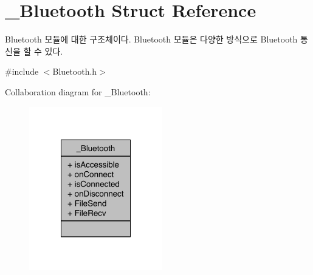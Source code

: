\hypertarget{struct__Bluetooth}{\section{\-\_\-\-Bluetooth Struct Reference}
\label{struct__Bluetooth}
}


Bluetooth 모듈에 대한 구조체이다. Bluetooth 모듈은 다양한 방식으로 Bluetooth 통신을 할 수 있다.  




{\ttfamily \#include $<$Bluetooth.\-h$>$}



Collaboration diagram for \-\_\-\-Bluetooth\-:\nopagebreak
\begin{figure}[H]
\begin{center}
\leavevmode
\includegraphics[width=164pt]{df/de6/struct__Bluetooth__coll__graph}
\end{center}
\end{figure}
